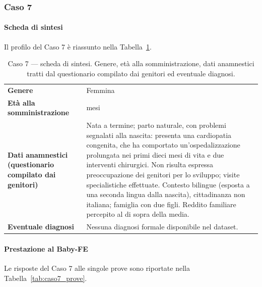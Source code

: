  \subsubsection*{Caso 7}

 \paragraph*{Scheda di sintesi}

Il profilo del Caso 7 è riassunto nella Tabella~\ref{tab:caso7_scheda}.

\begin{table}[htbp]
\centering
\caption[Caso 7 --- scheda di sintesi]{Caso 7 --- scheda di sintesi. Genere, età alla somministrazione, dati anamnestici tratti dal questionario compilato dai genitori ed eventuale diagnosi.}
\label{tab:caso7_scheda}
\begin{tabular}{|>{\raggedright\arraybackslash}p{4.3cm}|>{\raggedright\arraybackslash}p{9.2cm}|}
\toprule
\textbf{Genere} & Femmina \\
\textbf{Età alla somministrazione} & 27 mesi \\
\textbf{Dati anamnestici (questionario compilato dai genitori)} & Nata a termine; parto naturale, con problemi segnalati alla nascita: presenta una cardiopatia congenita, che ha comportato un'ospedalizzazione prolungata nei primi dieci mesi di vita e due interventi chirurgici. Non risulta espressa preoccupazione dei genitori per lo sviluppo; visite specialistiche effettuate. Contesto bilingue (esposta a una seconda lingua dalla nascita), cittadinanza non italiana; famiglia con due figli. Reddito familiare percepito al di sopra della media. \\
\textbf{Eventuale diagnosi} & Nessuna diagnosi formale disponibile nel dataset. \\
\bottomrule
\end{tabular}
\end{table}

 \paragraph*{Prestazione al Baby-FE}

Le risposte del Caso 7 alle singole prove sono riportate nella Tabella~\ref{tab:caso7_prove}.

